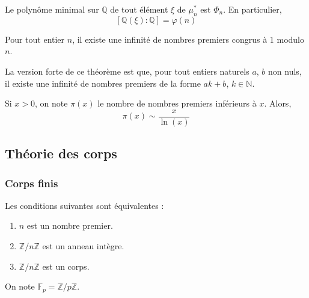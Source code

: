   \begin{corollary}
    Le polynôme minimal sur $\mathbb{Q}$ de tout élément $\xi$ de $\mu_n^*$ est $\Phi_n$. En particulier,
    \[ [\mathbb{Q}(\xi):\mathbb{Q}]=\varphi(n) \]
  \end{corollary}


  \begin{theorem}
    Pour tout entier $n$, il existe une infinité de nombres premiers congrus à $1$ modulo $n$.
  \end{theorem}

  \begin{remark}
    La version forte de ce théorème est que, pour tout entiers naturels $a$, $b$ non nuls, il existe une infinité de nombres premiers de la forme $ak+b$, $k \in \mathbb{N}$.
  \end{remark}


  \begin{theorem}
    Si $x > 0$, on note $\pi(x)$ le nombre de nombres premiers inférieurs à $x$. Alors,
    \[ \pi(x) \sim \frac{x}{\ln(x)} \]
  \end{theorem}

  \subsection{Théorie des corps}

  \subsubsection{Corps finis}


  \begin{proposition}
    Les conditions suivantes sont équivalentes :
    \begin{enumerate}[label={\bfseries(\roman*)}]
      \item $n$ est un nombre premier.
      \item $\mathbb{Z}/n\mathbb{Z}$ est un anneau intègre.
      \item $\mathbb{Z}/n\mathbb{Z}$ est un corps.
    \end{enumerate}
  \end{proposition}

  \begin{notation}
    On note $\mathbb{F}_p = \mathbb{Z}/p\mathbb{Z}$.
  \end{notation}

